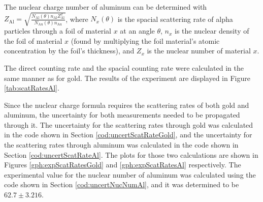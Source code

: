 \documentclass[a4paper]{article}
\begin{document}
\qq The nuclear charge number of aluminum can be determined with \\
\( Z_{\text{Al}} = \sqrt{\frac{N_{\text{Al}} (\theta) n_{\text{Al}}
    Z^2_{\text{Al}}}{N_{\text{Au}} (\theta) n_{\text{Au}}}} \), where
\( N_x (\theta) \) is the spacial scattering rate of alpha particles through a
foil of material \( x \) at an angle \( \theta \), \( n_x \) is the nuclear
density of the foil of material \( x \) (found by multiplying the foil
material's atomic concentration by the foil's thickness), and \( Z_x \) is the
nuclear number of material \( x \).

\qq The direct counting rate and the spacial counting rate were calculated in
the same manner as for gold. The results of the experiment are displayed in
Figure \ref{tab:scatRatesAl}.

\qq

\qq Since the nuclear charge formula requires the scattering rates of both gold
and aluminum, the uncertainty for both measurements needed to be propagated
through it. The uncertainty for the scattering rates through gold was calculated
in the code shown in Section \ref{cod:uncertScatRateGold}, and the uncertainty
for the scattering rates through aluminum was calculated in the code shown in
Section \ref{cod:uncertScatRateAl}. The plots for those two calculations are
shown in Figures \ref{gph:expScatRatesGold} and \ref{gph:expScatRatesAl}
respectively. The experimental value for the nuclear number of aluminum was
calculated using the code shown in Section \ref{cod:uncertNucNumAl}, and it was
determined to be \( 62.7 \pm 3.216 \).
\end{document}
